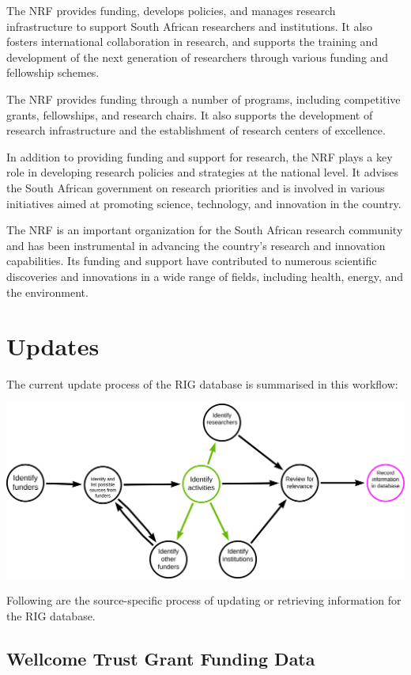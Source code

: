 \documentclass[
]{book}
\begin{document}
The NRF provides funding, develops policies, and manages research infrastructure to support South African researchers and institutions. It also fosters international collaboration in research, and supports the training and development of the next generation of researchers through various funding and fellowship schemes.

The NRF provides funding through a number of programs, including competitive grants, fellowships, and research chairs. It also supports the development of research infrastructure and the establishment of research centers of excellence.

In addition to providing funding and support for research, the NRF plays a key role in developing research policies and strategies at the national level. It advises the South African government on research priorities and is involved in various initiatives aimed at promoting science, technology, and innovation in the country.

The NRF is an important organization for the South African research community and has been instrumental in advancing the country's research and innovation capabilities. Its funding and support have contributed to numerous scientific discoveries and innovations in a wide range of fields, including health, energy, and the environment.

\hypertarget{updates}{%
\chapter{Updates}\label{updates}}

The current update process of the RIG database is summarised in this workflow:

\includegraphics{images/initial-acdc-db-search_NK.png}

Following are the source-specific process of updating or retrieving information for the RIG database.

\hypertarget{update-wellcome}{%
\section{Wellcome Trust Grant Funding Data}\label{update-wellcome}}
\end{document}
